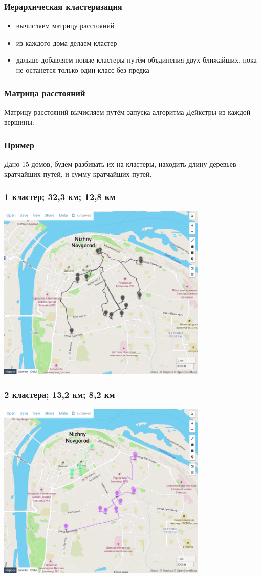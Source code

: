 \documentclass{beamer}
\begin{document}
\begin{frame}
	\frametitle{Иерархическая кластеризация}
	\begin{itemize}
		\item вычисляем матрицу расстояний
		\item из каждого дома делаем кластер
		\item дальше добавляем новые кластеры путём объдинения двух ближайших, пока не останется только один класс без предка
	\end{itemize}
\end{frame}

\begin{frame}
	\frametitle{Матрица расстояний}
	Матрицу расстояний вычисляем путём запуска алгоритма Дейкстры из каждой вершины.
\end{frame}

\begin{frame}
	\frametitle{Пример}
	Дано 15 домов, будем разбивать их на кластеры, находить длину деревьев кратчайших путей, и сумму кратчайших путей.

\end{frame}

\begin{frame}
	\frametitle{1 кластер; 32,3 км; 12,8 км}
	\centering
	\includegraphics[width=0.75\textwidth]{k1}
\end{frame}

\begin{frame}
	\frametitle{2 кластера; 13,2 км; 8,2 км}
	\centering
	\includegraphics[width=0.75\textwidth]{k2}
\end{frame}
\end{document}
